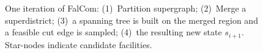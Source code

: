 \begin{figure}[t]
{
}
\caption{One iteration of FalCom: (1)~Partition supergraph;
         (2)~Merge a superdistrict;
         (3)~a spanning tree is built on the merged region and a feasible
         cut edge is sampled;
         (4)~the resulting new state $s_{i+1}$. Star-nodes indicate candidate facilities.}
\label{fig:bottom}
\end{figure}
